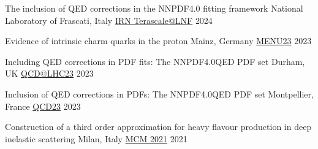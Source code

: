 \begin{cvhonors}

    \cvhonor
    {The inclusion of QED corrections in the NNPDF4.0 fitting framework} %
    {National Laboratory of Frascati, Italy}
    {\vspace{0.35cm}\href{https://indico.in2p3.fr/event/31806/contributions/136024/}{IRN Terascale@LNF}} %
    {\vspace{0.35cm}2024}

    \cvhonor
    {Evidence of intrinsic charm quarks in the proton} %
    {Mainz, Germany}
    {\href{https://indico.him.uni-mainz.de/event/171/contributions/1438/}{MENU23}} %
    {2023}

    \cvhonor
    {Including QED corrections in PDF fits: The NNPDF4.0QED PDF set} %
    {Durham, UK}
    {\href{https://conference.ippp.dur.ac.uk/event/1128/contributions/6473/}{QCD@LHC23}} %
    {2023}

    \cvhonor
    {Inclusion of QED corrections in PDFs: The NNPDF4.0QED PDF set} %
    {Montpellier, France}
    {\href{https://qcd23.sciencesconf.org/}{QCD23}} %
    {2023}

    \cvhonor
    {Construction of a third order approximation for heavy flavour production in deep inelastic scattering} %
    {Milan, Italy}
    {\vspace{0.35cm}\href{https://indico.cern.ch/event/1095418/contributions/4656984/}{MCM 2021}} %
    {\vspace{0.35cm}2021}
    
    


\end{cvhonors}